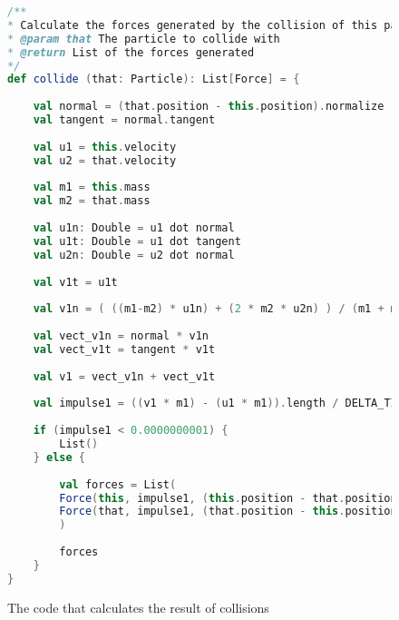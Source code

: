	\begin{figure}[h]
		\centering
		\begin{lstlisting}[language=Scala]
/**
* Calculate the forces generated by the collision of this particle and another
* @param that The particle to collide with
* @return List of the forces generated
*/
def collide (that: Particle): List[Force] = {
	
	val normal = (that.position - this.position).normalize
	val tangent = normal.tangent
	
	val u1 = this.velocity
	val u2 = that.velocity
	
	val m1 = this.mass
	val m2 = that.mass
	
	val u1n: Double = u1 dot normal
	val u1t: Double = u1 dot tangent
	val u2n: Double = u2 dot normal
	
	val v1t = u1t
	
	val v1n = ( ((m1-m2) * u1n) + (2 * m2 * u2n) ) / (m1 + m2)
	
	val vect_v1n = normal * v1n
	val vect_v1t = tangent * v1t
	
	val v1 = vect_v1n + vect_v1t
	
	val impulse1 = ((v1 * m1) - (u1 * m1)).length / DELTA_TIME
	
	if (impulse1 < 0.0000000001) {
		List()
	} else {
	
		val forces = List(
		Force(this, impulse1, (this.position - that.position).theta, alwaysDraw = true),
		Force(that, impulse1, (that.position - this.position).theta, alwaysDraw = true)
		)
		
		forces
	}
}
		\end{lstlisting}
		\caption{The code that calculates the result of collisions}
		\label{fig:collCode}
	\end{figure}

